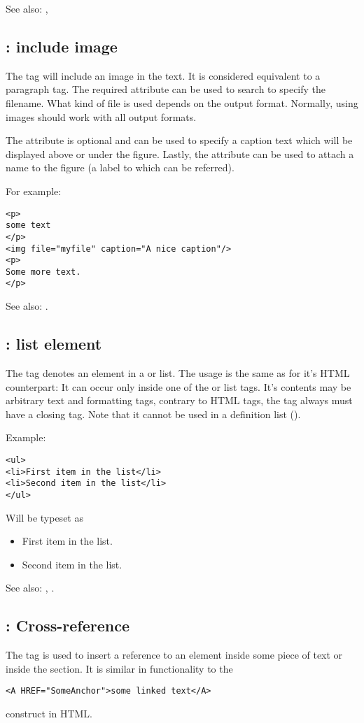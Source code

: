 See also: , 

\subsection{ : include image}
\label{tag:img} 
The  tag will include an image in the text. It is considered
equivalent to a paragraph tag. The required attribute  can 
be used to search to specify the filename. What kind of file is used
depends on the output format. Normally, using  images should
work with all output formats.

The  attribute is optional and can be used to specify a
caption text which will be displayed above or under the figure. 
Lastly, the  attribute can be used to attach
a name to the figure (a label to which can be referred).

For example:
\begin{verbatim}
<p>
some text
</p>
<img file="myfile" caption="A nice caption"/>
<p>
Some more text.
</p>
\end{verbatim}

See also: .

\subsection{ : list element}
\label{tag:li}
The tag  denotes an element in a  or  list.
The usage is the same as for it's HTML counterpart: It can occur 
only inside one of the   or  list tags.
It's contents may be arbitrary text and formatting tags, contrary to HTML
tags, the  tag always must have a closing tag. Note that it cannot be used in a
definition list ().

Example:
\begin{verbatim}
<ul>
<li>First item in the list</li>
<li>Second item in the list</li>
</ul>
\end{verbatim}
Will be typeset as
\begin{itemize}
\item First item in the list.
\item Second item in the list.
\end{itemize}

See also: , .

\subsection{ : Cross-reference}
\label{tag:link}
The  tag is used to insert a reference to an element inside some
piece of text or inside the  section. It is similar in
functionality to the 
\begin{verbatim}
<A HREF="SomeAnchor">some linked text</A>
\end{verbatim}
construct in HTML.

